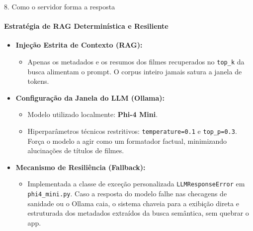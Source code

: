 \documentclass[10pt, aspectratio=169]{beamer}
\begin{document}
\begin{frame}{8. Como o servidor forma a resposta}
    \framesubtitle{Estratégia de RAG Determinística e Resiliente}
    \begin{itemize}
        \item \textbf{Injeção Estrita de Contexto (RAG):}
        \begin{itemize}
            \item Apenas os metadados e os resumos dos filmes recuperados no \texttt{top\_k} da busca alimentam o prompt. O corpus inteiro jamais satura a janela de tokens.
        \end{itemize}
        \vspace{0.1cm}
        \item \textbf{Configuração da Janela do LLM (Ollama):}
        \begin{itemize}
            \item Modelo utilizado localmente: \textbf{Phi-4 Mini}.
            \item Hiperparâmetros técnicos restritivos: \texttt{temperature=0.1} e \texttt{top\_p=0.3}. Força o modelo a agir como um formatador factual, minimizando alucinações de títulos de filmes.
        \end{itemize}
        \vspace{0.1cm}
        \item \textbf{Mecanismo de Resiliência (Fallback):}
        \begin{itemize}
            \item Implementada a classe de exceção personalizada \texttt{LLMResponseError} em \texttt{phi4\_mini.py}. Caso a resposta do modelo falhe nas checagens de sanidade ou o Ollama caia, o sistema chaveia para a exibição direta e estruturada dos metadados extraídos da busca semântica, sem quebrar o app.
        \end{itemize}
    \end{itemize}
\end{frame}
\end{document}
